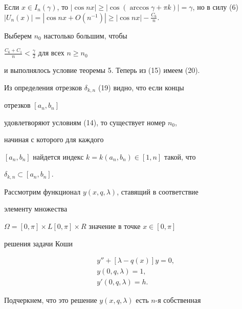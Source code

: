  


\begin{pf} 


Если $x\in I_n(\gamma)$, то $|\cos nx|\ge|\cos(\arccos\gamma+\pi 


k)|=\gamma$, но в силу (6) $|U_n(x)|=|\cos nx+O(n^{-1})|\ge |\cos 


nx|-\frac{C_6}{n}$. 


Выберем $n_0$ настолько большим, чтобы 


$\frac{C_6+C_1}{n}<\frac{\gamma}{2}$ для всех $n\ge n_0$ 


и выполнялось условие теоремы 5. Теперь из (15) имеем (20). 


\end{pf} 


 


\begin{note} 


Из определения отрезков $\delta_{k,n}$ (19) видно, что если концы 


отрезков $[a_n,b_n]$ 


удовлетворяют условиям (14), то существует номер $n_0$, 


начиная с которого для каждого 


$[a_n,b_n]$ найдется индекс $k=k(a_n,b_n)\in[1,n]$ такой, что 


$\delta_{k,n}\subset[a_n,b_n]$. 


\end{note} 


 


Рассмотрим функционал $y(x,q,\lambda)$, ставящий в соответствие 


элементу множества 


$\Omega=[0,\pi]\times L[0,\pi]\times R$ значение в точке $x\in[0,\pi]$ 


решения задачи Коши 


\begin{align} 


& y''+[\lambda-q(x)]y=0,\\ 


& y(0,q,\lambda)=1, \\ 


& y'(0,q,\lambda)=h. 


\end{align} 


 


Подчеркнем, что это решение $y(x,q,\lambda)$ есть $n$-я собственная 


